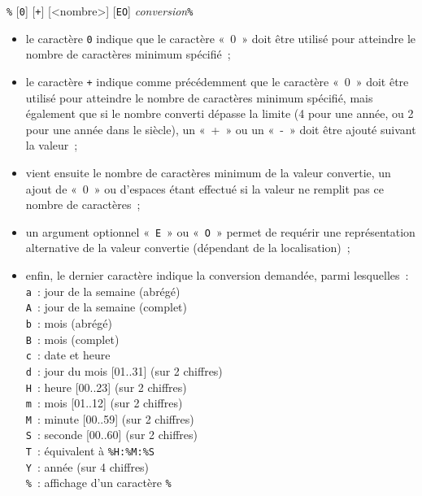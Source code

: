 \documentclass [twoside] {report}
\begin{document}
\texttt {\%} [\texttt {0}] [\texttt {+}] [<nombre>] [\texttt {E}\texttt {O}] \textit {conversion}\texttt {\%}

\begin {itemize}
    \item le caractère \texttt {0} indique que le caractère «~0~»
	doit être utilisé pour atteindre le nombre de caractères
	minimum spécifié~;

    \item le caractère \texttt {+} indique comme précédemment que
	le caractère «~0~» doit être utilisé pour atteindre le
	nombre de caractères minimum spécifié, mais également que
	si le nombre converti dépasse la limite (4 pour une année,
	ou 2 pour une année dans le siècle), un «~+~» ou un «~-~»
	doit être ajouté suivant la valeur~;

    \item vient ensuite le nombre de caractères minimum de la valeur
	convertie, un ajout de «~0~» ou d'espaces étant effectué si
	la valeur ne remplit pas ce nombre de caractères~;

    \item un argument optionnel «~\texttt {E}~» ou «~\texttt {O}~»
	permet de requérir une représentation alternative de la valeur
	convertie (dépendant de la localisation)~;

    \item enfin, le dernier caractère indique la conversion demandée,
	parmi lesquelles~: \\
	\texttt {a}~: jour de la semaine (abrégé) \\
	\texttt {A}~: jour de la semaine (complet) \\
	\texttt {b}~: mois (abrégé) \\
	\texttt {B}~: mois (complet) \\
	\texttt {c}~: date et heure \\
	\texttt {d}~: jour du mois [01..31] (sur 2 chiffres) \\
	\texttt {H}~: heure [00..23] (sur 2 chiffres) \\
	\texttt {m}~: mois [01..12] (sur 2 chiffres) \\
	\texttt {M}~: minute [00..59] (sur 2 chiffres) \\
	\texttt {S}~: seconde [00..60] (sur 2 chiffres) \\
	\texttt {T}~: équivalent à \verb|%H:%M:%S| \\
	\texttt {Y}~: année (sur 4 chiffres) \\
	\texttt {\%}~: affichage d'un caractère \texttt {\%}

\end {itemize}
\end{document}
